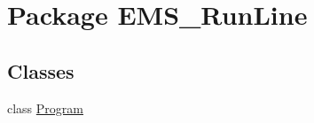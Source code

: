\hypertarget{namespace_e_m_s___run_line}{}\section{Package E\+M\+S\+\_\+\+Run\+Line}
\label{namespace_e_m_s___run_line}
\subsection*{Classes}
\begin{DoxyCompactItemize}
\item 
class \hyperlink{class_e_m_s___run_line_1_1_program}{Program}
\end{DoxyCompactItemize}

